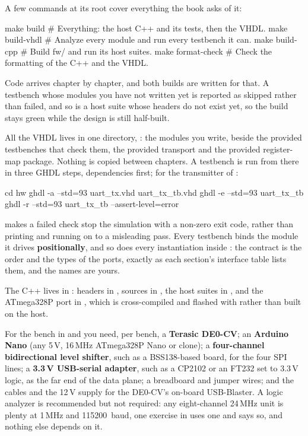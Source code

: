 \noindent A few commands at its root cover everything the book asks of it:

\begin{shell}
make build           # Everything: the host C++ and its tests, then the VHDL.
make build-vhdl      # Analyze every module and run every testbench it can.
make build-cpp       # Build fw/ and run its host suites.
make format-check    # Check the formatting of the C++ and the VHDL.
\end{shell}

\noindent Code arrives chapter by chapter, and both builds are written for that. A testbench whose
modules you have not written yet is reported as skipped rather than failed, and so is a host suite
whose headers do not exist yet, so the build stays green while the design is still half-built.

All the VHDL lives in one directory, : the modules you write, beside the provided
testbenches that check them, the provided transport and the provided register-map package. Nothing
is copied between chapters. A testbench is run from there in three GHDL steps, dependencies first;
for the transmitter of :

\begin{shell}
cd hw
ghdl -a --std=93 uart_tx.vhd uart_tx_tb.vhd
ghdl -e --std=93 uart_tx_tb
ghdl -r --std=93 uart_tx_tb --assert-level=error
\end{shell}

\noindent {} makes a failed check stop the simulation with a non-zero exit
code, rather than printing and running on to a misleading pass. Every testbench binds the module it
drives \textbf{positionally}, and so does every instantiation inside : the contract
is the order and the types of the ports, exactly as each section's interface table lists them, and
the names are yours.

The C++ lives in : headers in , sources in , the host suites
in , and the ATmega328P port in , which is cross-compiled and flashed with
 rather than built on the host.

For the bench in  and  you need, per bench, a \textbf{Terasic DE0-CV}; an
\textbf{Arduino Nano} (any 5\,V, 16\,MHz ATmega328P Nano or clone); a \textbf{four-channel
bidirectional level shifter}, such as a BSS138-based board, for the four SPI lines; a \textbf{3.3\,V
USB-serial adapter}, such as a CP2102 or an FT232 set to 3.3\,V logic, as the far end of the data
plane; a breadboard and jumper wires; and the cables and the 12\,V supply for the DE0-CV's on-board
USB-Blaster. A logic analyzer is recommended but not required: any eight-channel 24\,MHz unit is
plenty at 1\,MHz  and 115200~baud, one exercise in  uses one and says so, and
nothing else depends on it.
